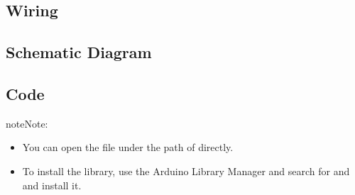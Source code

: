 \documentclass[a4paper,11pt,english]{sphinxmanual}
\begin{document}
\subsection{Wiring}
\label{\detokenize{Basic_Project/0.96_inch_OLED:wiring}}


\subsection{Schematic Diagram}
\label{\detokenize{Basic_Project/0.96_inch_OLED:schematic-diagram}}


\subsection{Code}
\label{\detokenize{Basic_Project/0.96_inch_OLED:code}}
\begin{sphinxadmonition}{note}{Note:}\begin{itemize}
\item {} 
\sphinxAtStartPar
You can open the file  under the path of  directly.

\item {} 
\sphinxAtStartPar
To install the library, use the Arduino Library Manager and search for  and  and install it.

\end{itemize}
\end{sphinxadmonition}
\end{document}
